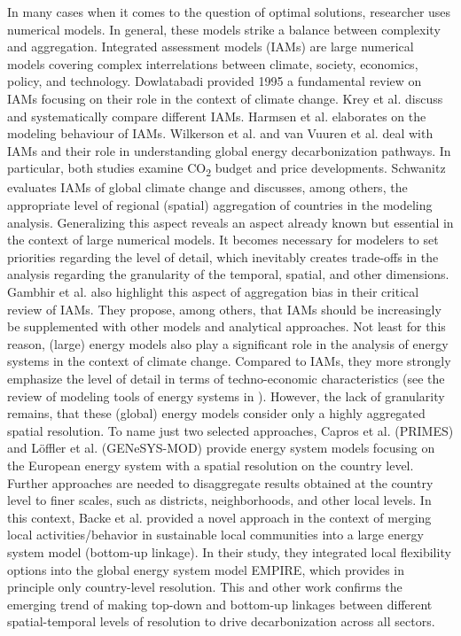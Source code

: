 In many cases when it comes to the question of optimal solutions, researcher uses numerical models. In general, these models strike a balance between complexity and aggregation. Integrated assessment models (IAMs) are large numerical models covering complex interrelations between climate, society, economics, policy, and technology. Dowlatabadi \cite{dowlatabadi1995integrated} provided 1995 a fundamental review on IAMs focusing on their role in the context of climate change. Krey et al. \cite{krey2019looking} discuss and systematically compare different IAMs. Harmsen et al. \cite{harmsen2021integrated} elaborates on the modeling behaviour of IAMs. Wilkerson et al. \cite{wilkerson2015comparison} and van Vuuren et al. \cite{van2016carbon} deal with IAMs and their role in understanding global energy decarbonization pathways. In particular, both studies examine CO\textsubscript{2} budget and price developments. Schwanitz \cite{schwanitz2013evaluating} evaluates IAMs of global climate change and discusses, among others, the appropriate level of regional (spatial) aggregation of countries in the modeling analysis. Generalizing this aspect reveals an aspect already known but essential in the context of large numerical models. It becomes necessary for modelers to set priorities regarding the level of detail, which inevitably creates trade-offs in the analysis regarding the granularity of the temporal, spatial, and other dimensions. Gambhir et al. \cite{gambhir2019review} also highlight this aspect of aggregation bias in their critical review of IAMs. They propose, among others, that IAMs should be increasingly be supplemented with other models and analytical approaches. Not least for this reason, (large) energy models also play a significant role in the analysis of energy systems in the context of climate change. Compared to IAMs, they more strongly emphasize the level of detail in terms of techno-economic characteristics (see the review of modeling tools of energy systems in \cite{ringkjob2018review}). However, the lack of granularity remains, that these (global) energy models consider only a highly aggregated spatial resolution. To name just two selected approaches, Capros et al. \cite{capros2012model} (PRIMES) and Löffler et al. \cite{loffler2017designing} (GENeSYS-MOD) provide energy system models focusing on the European energy system with a spatial resolution on the country level. Further approaches are needed to disaggregate results obtained at the country level to finer scales, such as districts, neighborhoods, and other local levels. In this context, Backe et al. \cite{backe2021heat} provided a novel approach in the context of merging local activities/behavior in sustainable local communities into a large energy system model (bottom-up linkage). In their study, they integrated local flexibility options into the global energy system model EMPIRE, which provides in principle only country-level resolution. This and other work confirms the emerging trend of making top-down and bottom-up linkages between different spatial-temporal levels of resolution to drive decarbonization across all sectors.\newline

